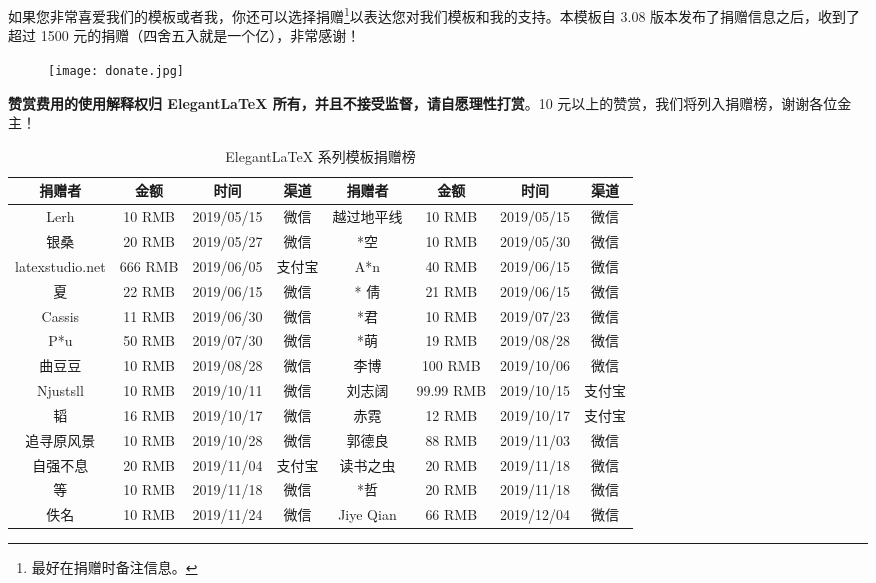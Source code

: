 \documentclass[cn,11pt]{elegantbook}
\begin{document}
如果您非常喜爱我们的模板或者我，你还可以选择捐赠\footnote{最好在捐赠时备注信息。}以表达您对我们模板和我的支持。本模板自 3.08 版本发布了捐赠信息之后，收到了超过 1500 元的捐赠（四舍五入就是一个亿），非常感谢！

\begin{figure}[htbp]
\centering
\texttt{[image: donate.jpg]}
\end{figure}

\textbf{赞赏费用的使用解释权归 Elegant\LaTeX{} 所有，并且不接受监督，请自愿理性打赏}。10 元以上的赞赏，我们将列入捐赠榜，谢谢各位金主！

\begin{table}[!htb]
  \centering
  \caption{Elegant\LaTeX{} 系列模板捐赠榜}
    \begin{tabular}{*{4}{>{\scriptsize}c}|*{4}{>{\scriptsize}c}}
    \hline
    \textbf{捐赠者} & \textbf{金额} & \textbf{时间} & \textbf{渠道} & \textbf{捐赠者} & \textbf{金额} & \textbf{时间} & \textbf{渠道} \\
    \hline
    Lerh  & 10 RMB & 2019/05/15 & 微信    & 越过地平线 & 10 RMB & 2019/05/15 & 微信 \\
    银桑    & 20 RMB & 2019/05/27 & 微信    & *空    & 10 RMB & 2019/05/30 & 微信 \\
    latexstudio.net & 666 RMB & 2019/06/05 & 支付宝   & A*n   & 40 RMB & 2019/06/15 & 微信 \\
    * 夏   & 22 RMB & 2019/06/15 & 微信    & * 倩   & 21 RMB  & 2019/06/15 & 微信 \\
    Cassis & 11 RMB & 2019/06/30 & 微信    & *君    & 10 RMB & 2019/07/23 & 微信 \\
    P*u   & 50 RMB & 2019/07/30 & 微信    & *萌    & 19 RMB & 2019/08/28 & 微信 \\
    曲豆豆   & 10 RMB & 2019/08/28 & 微信    & 李博    & 100 RMB & 2019/10/06 & 微信 \\
    Njustsll & 10 RMB & 2019/10/11 & 微信    & 刘志阔   & 99.99 RMB & 2019/10/15 & 支付宝 \\
    * 韬   & 16 RMB & 2019/10/17 & 微信    & 赤霓    & 12 RMB & 2019/10/17 & 支付宝 \\
    追寻原风景 & 10 RMB & 2019/10/28 & 微信    & 郭德良   & 88 RMB & 2019/11/03 & 微信 \\
    自强不息  & 20 RMB & 2019/11/04 & 支付宝   & 读书之虫  & 20 RMB & 2019/11/18 & 微信 \\
    *等    & 10 RMB & 2019/11/18 & 微信    & *哲    & 20 RMB & 2019/11/18 & 微信 \\
    佚名    & 10 RMB & 2019/11/24 & 微信    & Jiye Qian & 66 RMB & 2019/12/04 & 微信 \\

\end{tabular}
\end{table}
\end{document}
